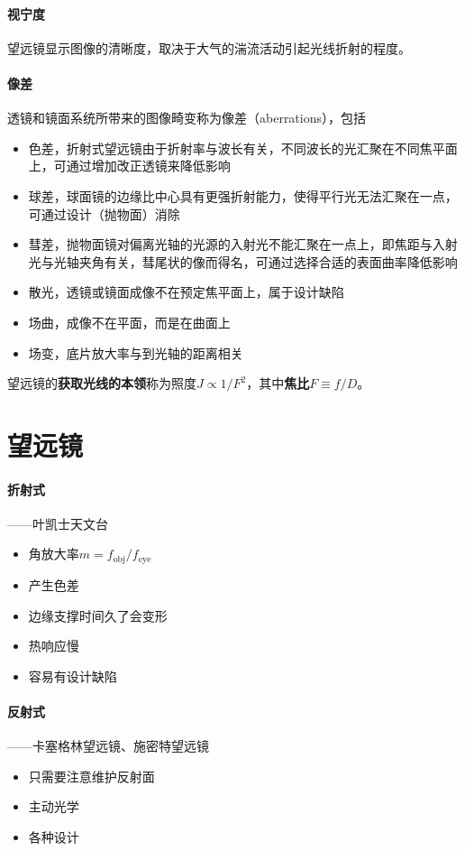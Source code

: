 \documentclass[openany]{ctexbook}
\begin{document}
\paragraph{视宁度}
望远镜显示图像的清晰度，取决于大气的湍流活动引起光线折射的程度。

\paragraph{像差}
透镜和镜面系统所带来的图像畸变称为像差（aberrations），包括
\begin{itemize}
  \item 色差，折射式望远镜由于折射率与波长有关，不同波长的光汇聚在不同焦平面上，可通过增加改正透镜来降低影响
  \item 球差，球面镜的边缘比中心具有更强折射能力，使得平行光无法汇聚在一点，可通过设计（抛物面）消除
  \item 彗差，抛物面镜对偏离光轴的光源的入射光不能汇聚在一点上，即焦距与入射光与光轴夹角有关，彗尾状的像而得名，可通过选择合适的表面曲率降低影响
  \item 散光，透镜或镜面成像不在预定焦平面上，属于设计缺陷
  \item 场曲，成像不在平面，而是在曲面上
  \item 场变，底片放大率与到光轴的距离相关
\end{itemize}

望远镜的\textbf{获取光线的本领}称为照度$J\propto 1/F^2$，其中\textbf{焦比}$F\equiv f/D$。

\section{望远镜}
\paragraph{折射式}——叶凯士天文台
\begin{itemize}
  \item 角放大率$m=f_\mathrm{obj}/f_\mathrm{eye}$
  \item 产生色差
  \item 边缘支撑时间久了会变形
  \item 热响应慢
  \item 容易有设计缺陷
\end{itemize}

\paragraph{反射式}——卡塞格林望远镜、施密特望远镜
\begin{itemize}
  \item 只需要注意维护反射面
  \item 主动光学
  \item 各种设计
\end{itemize}
\end{document}
